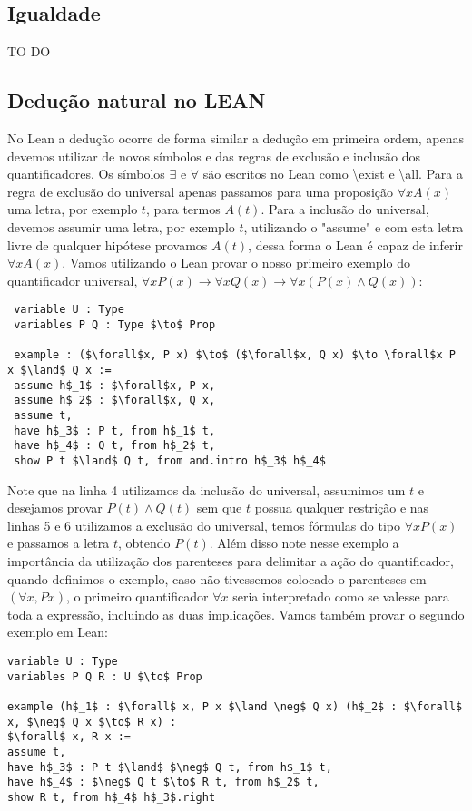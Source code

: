 \subsection{Igualdade}
TO DO 
\subsection{Dedução natural no LEAN}
No Lean a dedução ocorre de forma similar a dedução em primeira ordem, apenas devemos utilizar de novos símbolos e das 
regras de exclusão e inclusão dos quantificadores. Os símbolos $\exists $ e $\forall $ são escritos no Lean como \textbackslash exist 
e  \textbackslash all. Para a regra de exclusão do universal apenas passamos para uma proposição $\forall x A(x)$ uma letra,
por exemplo $t$, para termos $A(t)$. Para a inclusão do universal, devemos assumir uma letra, por exemplo $t$, utilizando o
"assume" e com esta letra livre de qualquer hipótese provamos $A(t)$, dessa forma o Lean é capaz de inferir $\forall x A(x)$.
\newline Vamos utilizando o Lean provar o nosso primeiro exemplo do quantificador universal, $\forall xP(x) \to \forall x Q(x) \to \forall x(P(x) \land Q(x))$:
\begin{lstlisting}
 variable U : Type
 variables P Q : Type $\to$ Prop

 example : ($\forall$x, P x) $\to$ ($\forall$x, Q x) $\to \forall$x P x $\land$ Q x :=  
 assume h$_1$ : $\forall$x, P x,
 assume h$_2$ : $\forall$x, Q x,
 assume t,
 have h$_3$ : P t, from h$_1$ t,
 have h$_4$ : Q t, from h$_2$ t,
 show P t $\land$ Q t, from and.intro h$_3$ h$_4$ 
\end{lstlisting}
Note que na linha 4 utilizamos da inclusão do universal, assumimos um $t$ e desejamos provar $P(t) \land Q(t)$ 
sem que $t$ possua qualquer restrição e nas linhas 5 e 6 utilizamos a exclusão do universal, temos fórmulas do
tipo $\forall x P(x)$ e passamos a letra $t$, obtendo $P(t)$. Além disso note nesse exemplo a importância da utilização
dos parenteses para delimitar a ação do quantificador, quando definimos o exemplo, caso não tivessemos colocado
o parenteses em  $(\forall x, P x)$, o primeiro quantificador $\forall x$ seria interpretado como se valesse para toda
a expressão, incluindo as duas implicações.
\newline Vamos também provar o segundo exemplo em Lean:
\begin{lstlisting}
variable U : Type
variables P Q R : U $\to$ Prop

example (h$_1$ : $\forall$ x, P x $\land \neg$ Q x) (h$_2$ : $\forall$ x, $\neg$ Q x $\to$ R x) :
$\forall$ x, R x :=
assume t,
have h$_3$ : P t $\land$ $\neg$ Q t, from h$_1$ t,
have h$_4$ : $\neg$ Q t $\to$ R t, from h$_2$ t,
show R t, from h$_4$ h$_3$.right
\end{lstlisting}
